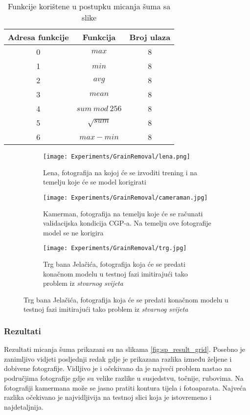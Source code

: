 \begin{table}
	\centering
	\begin{tabular}{||c c c||}
		\hline
		Adresa funkcije & Funkcija & Broj ulaza \\ [0.5ex]
		\hline \hline
		0 & $max$ & 8 \\
		1 & $min$ & 8 \\ 
		2 & $avg$ & 8 \\ 
		3 & $mean$ & 8 \\ 
		4 & $sum\ mod\ 256$ & 8 \\ 
		5 & $\sqrt{sum}$ & 8 \\ 
		6 & $max - min$ & 8 \\ [1ex]
		\hline
	\end{tabular}
	\caption{Funkcije korištene u postupku micanja šuma sa slike}
	\label{table:sp_function_set}
\end{table}

\begin{figure}
	\caption{Fotografije na koje će biti primjenjen šum korištene u trening, validacijskoj i testnoj fazi}
	\begin{subfigure}[t]{0.45\textwidth}
		\texttt{[image: Experiments/GrainRemoval/lena.png]}
		\caption{Lena, fotografija na kojoj će se izvoditi trening i na temelju koje će se model korigirati}
		\label{fig:sp_train_sample}
	\end{subfigure}
	\begin{subfigure}[t]{0.45\textwidth}
		\texttt{[image: Experiments/GrainRemoval/cameraman.jpg]}
		\caption{Kamerman, fotografija na temelju koje će se računati validacijska kondicija CGP-a. Na temelju ove fotografije model se ne korigira}
		\label{fig:sp_val_sample}
	\end{subfigure}
	\begin{subfigure}[t]{0.45\textwidth}
		\texttt{[image: Experiments/GrainRemoval/trg.jpg]}
		\caption{Trg bana Jelačića, fotografija koja će se predati konačnom modelu u testnoj fazi imitirajući tako problem iz \emph{stvarnog svijeta}}
		\label{fig:sp_test_sample}
	\end{subfigure}
	\label{fig:sp_samples}
\end{figure}

\subsubsection{Rezultati}
Rezultati micanja šuma prikazani su na slikama \ref{fig:sp_result_grid}.
Posebno je zanimljivo vidjeti posljednji redak gdje je prikazana razlika između željene i dobivene fotografije.
Vidljivo je i očekivano da je najveći problem nastao na područjima fotografije gdje su velike razlike u susjedstvu, točnije, rubovima.
Na fotografiji kamermana može se jasno pratiti kontura tijela i fotoaparata.
Najveća razlika očekivano je najvidljivija na testnoj slici koja je istovremeno i najdetaljnija.

